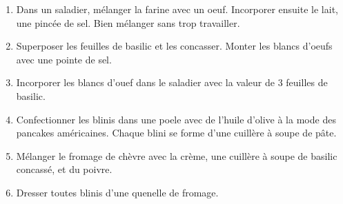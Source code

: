 \altdish{}

\begin{ingredients}
\end{ingredients}


\begin{recipe}
  \begin{enumerate}

  \item Dans un saladier, m\'elanger la farine avec un oeuf.
    Incorporer ensuite le lait, une pinc\'ee de sel.  Bien m\'elanger
    sans trop travailler.

  \item Superposer les feuilles de basilic et les concasser.  Monter
    les blancs d'oeufs avec une pointe de sel.

  \item Incorporer les blancs d'ouef dans le saladier avec la valeur
    de 3 feuilles de basilic.

  \item Confectionner les blinis dans une poele avec de l'huile
    d'olive \`a la mode des pancakes am\'ericaines.  Chaque blini se
    forme d'une cuill\`ere \`a soupe de p\^ate.

  \item M\'elanger le fromage de ch\`evre avec la cr\`eme, une
    cuill\`ere \`a soupe de basilic concass\'e, et du poivre.

  \item Dresser toutes blinis d'une quenelle de fromage.

  \end{enumerate}
\end{recipe}
